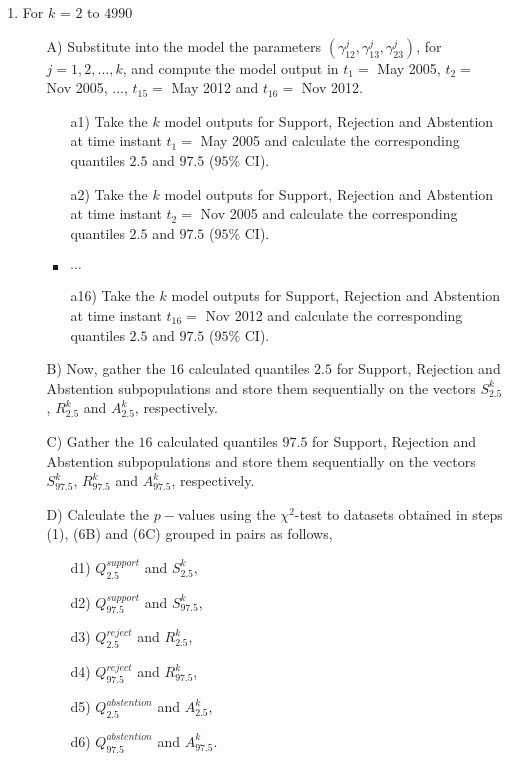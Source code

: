 \begin{enumerate}
\item For $k$ = $2$ to $4990$

\begin{itemize}
\item[A)] Substitute into the model the parameters $( \gamma_{12}^j, \gamma_{13}^j, \gamma_{23}^j )$, for $j=1,2,\ldots, k$, and compute the model output in $t_1=$ May 2005, $t_2=$ Nov 2005, ..., $t_{15}=$ May 2012 and $t_{16}=$ Nov 2012.  

\begin{itemize}
\item[a1)] Take the $k$ model outputs for Support, Rejection and Abstention at time instant $t_1=$ May 2005 and calculate the corresponding quantiles $2.5$ and $97.5$ ($95\%$ CI).  
\item[a2)] Take the $k$ model outputs for Support, Rejection and Abstention at time instant $t_2=$ Nov 2005 and calculate the corresponding quantiles $2.5$ and $97.5$ ($95\%$ CI).  
\item $\cdots$
\item[a16)] Take the $k$ model outputs for Support, Rejection and Abstention at time instant $t_{16}=$ Nov 2012 and calculate the corresponding quantiles $2.5$ and $97.5$ ($95\%$ CI).  
\end{itemize}

\item[B)] Now, gather the $16$ calculated quantiles $2.5$ for Support, Rejection and Abstention subpopulations and store them sequentially on the vectors $S_{2.5}^k$, $R_{2.5}^k$ and $A_{2.5}^k$, respectively.
\item[C)] Gather the $16$ calculated quantiles $97.5$ for Support, Rejection and Abstention subpopulations and store them sequentially on the vectors $S_{97.5}^k$, $R_{97.5}^k$ and $A_{97.5}^k$, respectively.

\item[D)] Calculate the $p-$values using the $\chi^2$-test to datasets obtained in steps (1), (6B) and (6C) grouped in pairs as follows,

\begin{itemize}
\item[d1)] $Q_{2.5}^{support}$ and $S_{2.5}^k$,
\item[d2)] $Q_{97.5}^{support}$ and $S_{97.5}^k$,
\item[d3)] $Q_{2.5}^{reject}$ and $R_{2.5}^k$,
\item[d4)] $Q_{97.5}^{reject}$ and $R_{97.5}^k$,
\item[d5)] $Q_{2.5}^{abstention}$ and $A_{2.5}^k$,
\item[d6)] $Q_{97.5}^{abstention}$ and $A_{97.5}^k$.
\end{itemize}


\end{itemize}
\end{enumerate}
